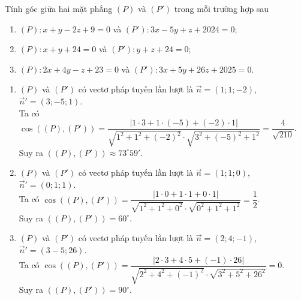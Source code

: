 \begin{bt}%

	Tính góc giữa hai mặt phẳng $(P)$ và $(P')$ trong mỗi trường hợp sau
	\begin{enumerate}
		\item $(P)\colon x+y-2z+9=0$ và $(P')\colon 3x-5y+z+2024=0$;
		\item $(P)\colon x+y+24=0$ và $(P')\colon y+z+24=0$;
		\item $(P)\colon 2x+4y-z+23=0$ và $(P')\colon 3x+5y+26z+2025=0$.
	\end{enumerate}
	\loigiai
	{
		\begin{enumerate}
			\item $(P)$ và $(P')$ có vectơ pháp tuyến lần lượt là $\overrightarrow{n}=(1;1;-2)$, $\overrightarrow{n}'=(3;-5;1)$.\\
			Ta có $\cos\left ((P),(P') \right )=\dfrac{\left |1\cdot 3+1\cdot (-5)+(-2)\cdot 1 \right |}{\sqrt{1^2+1^2+(-2)^2}\cdot\sqrt{3^2+(-5)^2+1^2}}=\dfrac{4}{\sqrt{210}}$.\\
			Suy ra $((P),(P'))\approx 73^{\circ}59'$.
			\item $(P)$ và $(P')$ có vectơ pháp tuyến lần lượt là $\overrightarrow{n}=(1;1;0)$, $\overrightarrow{n}'=(0;1;1)$.\\
			Ta có $\cos\left ((P),(P') \right )=\dfrac{\left |1\cdot 0+1\cdot 1+0\cdot 1 \right |}{\sqrt{1^2+1^2+0^2}\cdot\sqrt{0^2+1^2+1^2}}=\dfrac{1}{2}$.\\
			Suy ra $((P),(P'))=60^{\circ}$.
			\item $(P)$ và $(P')$ có vectơ pháp tuyến lần lượt là $\overrightarrow{n}=(2;4;-1)$, $\overrightarrow{n}'=(3-5;26)$.\\
			Ta có $\cos\left ((P),(P') \right )=\dfrac{\left |2\cdot 3+4\cdot 5+(-1)\cdot 26 \right |}{\sqrt{2^2+4^2+(-1)^2}\cdot\sqrt{3^2+5^2+26^2}}=0$.\\
			Suy ra $((P),(P'))=90^{\circ}$.
		\end{enumerate}
	}
\end{bt}


